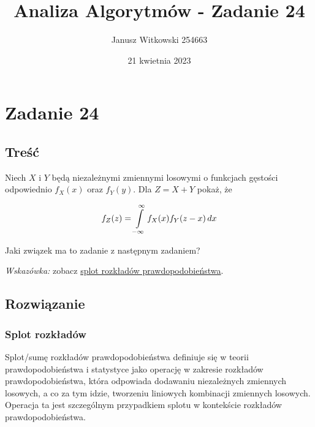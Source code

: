 \documentclass{article}
\title{Analiza Algorytmów - Zadanie 24}
\author{Janusz Witkowski 254663}
\date{21 kwietnia 2023}
\begin{document}
    \maketitle
    

    \section{Zadanie 24}
    \subsection{Treść}
    Niech $X$ i $Y$ będą niezależnymi zmiennymi losowymi o funkcjach gęstości odpowiednio $f_X(x)$ oraz $f_Y(y)$. Dla $Z = X + Y$ pokaż, że

    \[ f_Z(z) = \int\displaylimits_{-\infty}^{\infty} f_X(x)f_Y(z - x) \,dx \]

    Jaki związek ma to zadanie z następnym zadaniem?

    \textit{Wskazówka:} zobacz \href{https://en.wikipedia.org/wiki/Convolution_of_probability_distributions}{splot rozkładów prawdopodobieństwa}. 


    \subsection{Rozwiązanie}
    \subsubsection{Splot rozkładów}

    Splot/sumę rozkładów prawdopodobieństwa definiuje się w teorii prawdopodobieństwa i statystyce jako operację w zakresie rozkładów prawdopodobieństwa, 
    która odpowiada dodawaniu niezależnych zmiennych losowych, a co za tym idzie, tworzeniu liniowych kombinacji zmiennych losowych. 
    Operacja ta jest szczególnym przypadkiem splotu w kontekście rozkładów prawdopodobieństwa.

\end{document}
